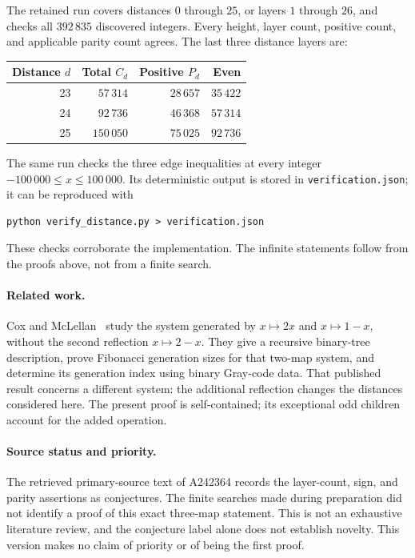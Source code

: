 \documentclass[11pt]{article}
\theoremstyle{remark}
\begin{document}
The retained run covers distances $0$ through $25$, or layers $1$ through
$26$, and checks all $392\,835$ discovered integers. Every height,
layer count, positive count, and applicable parity count agrees. The
last three distance layers are:
\begin{center}
\begin{tabular}{rrrr}
\toprule
Distance $d$ & Total $C_d$ & Positive $P_d$ & Even \\
\midrule
23 & $57\,314$ & $28\,657$ & $35\,422$ \\
24 & $92\,736$ & $46\,368$ & $57\,314$ \\
25 & $150\,050$ & $75\,025$ & $92\,736$ \\
\bottomrule
\end{tabular}
\end{center}
The same run checks the three edge inequalities at every integer
$-100\,000\le x\le100\,000$. Its deterministic output is stored in
\texttt{verification.json}; it can be reproduced with
\begin{verbatim}
python verify_distance.py > verification.json
\end{verbatim}
These checks corroborate the implementation. The infinite statements
follow from the proofs above, not from a finite search.

\paragraph{Related work.}
Cox and McLellan~\cite{cox-mclellan} study the system generated by
$x\mapsto2x$ and $x\mapsto1-x$, without the second reflection
$x\mapsto2-x$. They give a recursive binary-tree description, prove
Fibonacci generation sizes for that two-map system, and determine its
generation index using binary Gray-code data. That published result
concerns a different system: the additional reflection changes the
distances considered here. The present proof is self-contained; its
exceptional odd children account for the added operation.

\paragraph{Source status and priority.}
The retrieved primary-source text of A242364 records the layer-count,
sign, and parity assertions as conjectures. The finite searches made
during preparation did not identify a proof of this exact three-map
statement. This is not an exhaustive literature review, and the
conjecture label alone does not establish novelty. This version makes
no claim of priority or of being the first proof.
\end{document}
